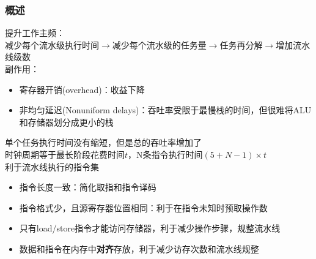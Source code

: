 \subsubsection{概述}
提升工作主频：\\
减少每个流水级执行时间$\to$减少每个流水级的任务量$\to$任务再分解$\to$增加流水线级数\\
副作用：
\begin{itemize}
	\item 寄存器开销(overhead)：收益下降
	\item 非均匀延迟(Nonuniform delays)：吞吐率受限于最慢栈的时间，但很难将ALU和存储器划分成更小的栈
\end{itemize}
单个任务执行时间没有缩短，但是总的吞吐率增加了\\
时钟周期等于最长阶段花费时间$t$，N条指令执行时间$(5+N-1)\times t$\\
利于流水线执行的指令集
\begin{itemize}
	\item 指令长度一致：简化取指和指令译码
	\item 指令格式少，且源寄存器位置相同：利于在指令未知时预取操作数
	\item 只有load/store指令才能访问存储器，利于减少操作步骤，规整流水线
	\item 数据和指令在内存中\textbf{对齐}存放，利于减少访存次数和流水线规整
\end{itemize}


